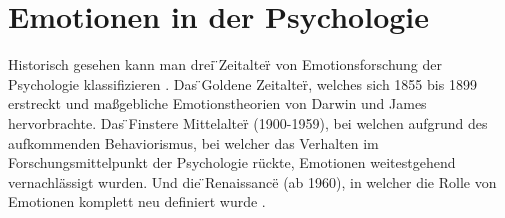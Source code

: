 \section{Emotionen in der Psychologie}
Historisch gesehen kann man drei  \"{}Zeitalter\"{} von Emotionsforschung der Psychologie klassifizieren \cite{stearns_reconstructing_2009}. Das \"{}Goldene Zeitalter\"{}, welches sich 1855 bis 1899 erstreckt und maßgebliche Emotionstheorien von Darwin und James hervorbrachte. Das \"{}Finstere Mittelalter\"{} (1900-1959), bei welchen aufgrund des aufkommenden Behaviorismus, bei welcher das Verhalten im Forschungsmittelpunkt der Psychologie rückte, Emotionen weitestgehend vernachlässigt wurden. Und die \"{}Renaissance\"{} (ab 1960), in welcher die Rolle von Emotionen komplett neu definiert wurde \cite{anselm_winfried_muller_emotionen_2013}.

